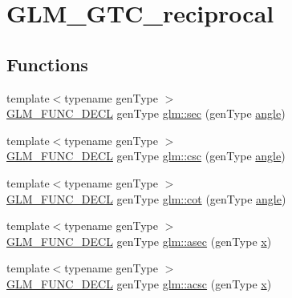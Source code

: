 \hypertarget{group__gtc__reciprocal}{}\section{G\+L\+M\+\_\+\+G\+T\+C\+\_\+reciprocal}
\label{group__gtc__reciprocal}
\subsection*{Functions}
\begin{DoxyCompactItemize}
\item 
{\footnotesize template$<$typename gen\+Type $>$ }\\\mbox{\hyperlink{setup_8hpp_ab2d052de21a70539923e9bcbf6e83a51}{G\+L\+M\+\_\+\+F\+U\+N\+C\+\_\+\+D\+E\+CL}} gen\+Type \mbox{\hyperlink{group__gtc__reciprocal_gae4bcbebee670c5ea155f0777b3acbd84}{glm\+::sec}} (gen\+Type \mbox{\hyperlink{_s_d_l__opengl__glext_8h_a9e06c1f76a20fed54ca742cd25cb02c4}{angle}})
\item 
{\footnotesize template$<$typename gen\+Type $>$ }\\\mbox{\hyperlink{setup_8hpp_ab2d052de21a70539923e9bcbf6e83a51}{G\+L\+M\+\_\+\+F\+U\+N\+C\+\_\+\+D\+E\+CL}} gen\+Type \mbox{\hyperlink{group__gtc__reciprocal_ga59dd0005b6474eea48af743b4f14ebbb}{glm\+::csc}} (gen\+Type \mbox{\hyperlink{_s_d_l__opengl__glext_8h_a9e06c1f76a20fed54ca742cd25cb02c4}{angle}})
\item 
{\footnotesize template$<$typename gen\+Type $>$ }\\\mbox{\hyperlink{setup_8hpp_ab2d052de21a70539923e9bcbf6e83a51}{G\+L\+M\+\_\+\+F\+U\+N\+C\+\_\+\+D\+E\+CL}} gen\+Type \mbox{\hyperlink{group__gtc__reciprocal_ga3a7b517a95bbd3ad74da3aea87a66314}{glm\+::cot}} (gen\+Type \mbox{\hyperlink{_s_d_l__opengl__glext_8h_a9e06c1f76a20fed54ca742cd25cb02c4}{angle}})
\item 
{\footnotesize template$<$typename gen\+Type $>$ }\\\mbox{\hyperlink{setup_8hpp_ab2d052de21a70539923e9bcbf6e83a51}{G\+L\+M\+\_\+\+F\+U\+N\+C\+\_\+\+D\+E\+CL}} gen\+Type \mbox{\hyperlink{group__gtc__reciprocal_ga2c5b7f962c2c9ff684e6d2de48db1f10}{glm\+::asec}} (gen\+Type \mbox{\hyperlink{_s_d_l__opengl_8h_ad0e63d0edcdbd3d79554076bf309fd47}{x}})
\item 
{\footnotesize template$<$typename gen\+Type $>$ }\\\mbox{\hyperlink{setup_8hpp_ab2d052de21a70539923e9bcbf6e83a51}{G\+L\+M\+\_\+\+F\+U\+N\+C\+\_\+\+D\+E\+CL}} gen\+Type \mbox{\hyperlink{group__gtc__reciprocal_ga1b4bed91476b9b915e76b4a30236d330}{glm\+::acsc}} (gen\+Type \mbox{\hyperlink{_s_d_l__opengl_8h_ad0e63d0edcdbd3d79554076bf309fd47}{x}})

\end{DoxyCompactItemize}
